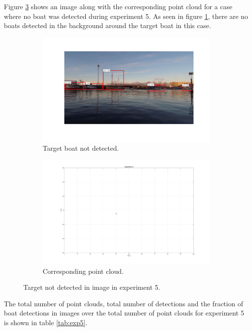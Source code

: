 Figure \ref{fig:issues_ex5} shows an image along with the corresponding point cloud for a case where no boat was detected during experiment 5. As seen in figure \ref{fig:sub_ex5_issue}, there are no boats detected in the background around the target boat in this case. 
\begin{figure}[H]
	\centering
	\begin{subfigure}[t]{.5\linewidth}
		\centering
		\includegraphics[width=\linewidth]{fig/ex5_miss.png}
		\caption{Target boat not detected.}
		\label{fig:sub_ex5_issue}
	\end{subfigure}%
	\begin{subfigure}[t]{.5\linewidth}
		\centering
		\includegraphics[width=\linewidth]{fig/ex5_miss_pc.png}
		\caption{Corresponding point cloud.}
		\label{fig:sub_ex5_issue2}
	\end{subfigure}
	\caption{Target not detected in image in experiment 5.}
	\label{fig:issues_ex5}
\end{figure}
The total number of point clouds, total number of detections and the fraction of boat detections in images over the total number of point clouds for experiment 5 is shown in table \ref{tab:exp5}.
